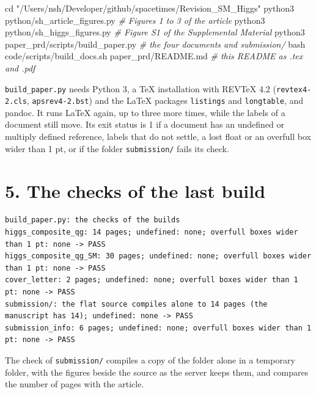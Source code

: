 \documentclass[
  10pt,
]{article}
\newenvironment{Shaded}{}{}
\newcommand{\BuiltInTok}[1]{\textcolor[rgb]{0.00,0.50,0.00}{#1}}
\newcommand{\CommentTok}[1]{\textcolor[rgb]{0.38,0.63,0.69}{\textit{#1}}}
\newcommand{\ExtensionTok}[1]{#1}
\newcommand{\FunctionTok}[1]{\textcolor[rgb]{0.02,0.16,0.49}{#1}}
\newcommand{\NormalTok}[1]{#1}
\newcommand{\StringTok}[1]{\textcolor[rgb]{0.25,0.44,0.63}{#1}}
\begin{document}
\begin{Shaded}
\begin{Highlighting}[]
\BuiltInTok{cd} \StringTok{"/Users/nsh/Developer/github/spacetimes/Revision\_SM\_Higgs"}
\ExtensionTok{python3}\NormalTok{ python/sh\_article\_figures.py                 }\CommentTok{\# Figures 1 to 3 of the article}
\ExtensionTok{python3}\NormalTok{ python/sh\_higgs\_figures.py                   }\CommentTok{\# Figure S1 of the Supplemental Material}
\ExtensionTok{python3}\NormalTok{ paper\_prd/scripts/build\_paper.py             }\CommentTok{\# the four documents and submission/}
\FunctionTok{bash}\NormalTok{ code/scripts/build\_docs.sh paper\_prd/README.md  }\CommentTok{\# this README as .tex and .pdf}
\end{Highlighting}
\end{Shaded}

\texttt{build\_paper.py} needs Python 3, a TeX installation with REVTeX
4.2 (\texttt{revtex4-2.cls}, \texttt{apsrev4-2.bst}) and the LaTeX
packages \texttt{listings} and \texttt{longtable}, and pandoc. It runs
LaTeX again, up to three more times, while the labels of a document
still move. Its exit status is 1 if a document has an undefined or
multiply defined reference, labels that do not settle, a lost float or
an overfull box wider than 1 pt, or if the folder \texttt{submission/}
fails its check.

\hypertarget{the-checks-of-the-last-build}{%
\section{5. The checks of the last
build}\label{the-checks-of-the-last-build}}

\begin{verbatim}
build_paper.py: the checks of the builds
higgs_composite_qg: 14 pages; undefined: none; overfull boxes wider than 1 pt: none -> PASS
higgs_composite_qg_SM: 30 pages; undefined: none; overfull boxes wider than 1 pt: none -> PASS
cover_letter: 2 pages; undefined: none; overfull boxes wider than 1 pt: none -> PASS
submission/: the flat source compiles alone to 14 pages (the manuscript has 14); undefined: none -> PASS
submission_info: 6 pages; undefined: none; overfull boxes wider than 1 pt: none -> PASS
\end{verbatim}

The check of \texttt{submission/} compiles a copy of the folder alone in
a temporary folder, with the figures beside the source as the server
keeps them, and compares the number of pages with the article.
\end{document}
